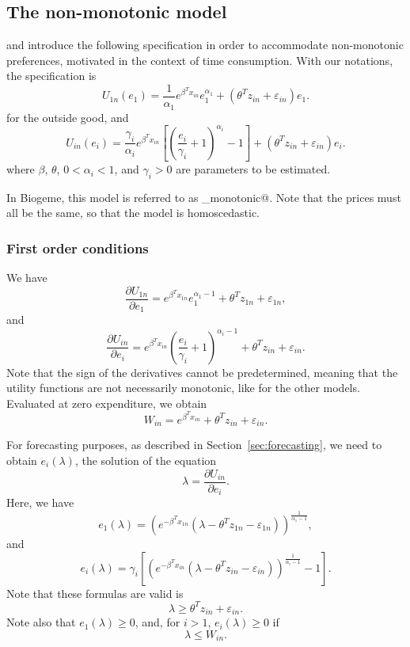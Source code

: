 \documentclass[12pt,a4paper]{article}
\begin{document}
\subsection{The non-monotonic model}

 and  introduce the following specification in order to accommodate non-monotonic preferences, motivated in the context of time consumption. With our notations, the specification is
\[
U_{1n}(e_1) =  \frac{1}{\alpha_1}e^{\beta^T x_{in}}e_1^{\alpha_1}+(\theta^T z_{in} + \varepsilon_{in}) e_1.
\]
for the outside good, and
\[
U_{in}(e_i) = \frac{\gamma_i}{\alpha_i} e^{\beta^T x_{in}}\left[\left(\frac{e_i}{\gamma_i}+1\right)^{\alpha_i}-1\right]+(\theta^T z_{in} + \varepsilon_{in}) e_i.
\]
where $\beta$, $\theta$, $0 < \alpha_i < 1$, and $\gamma_i > 0$  are parameters to be
estimated.

In Biogeme, this model is referred to as \lstinline@non_monotonic@.
Note that the prices must all be the same, so that the model is homoscedastic.

\subsubsection*{First order conditions}

We have
\[
\frac{\partial U_{1n}}{\partial e_1} = e^{\beta^T x_{1n}}  e_1^{\alpha_1-1} + \theta^T z_{1n} + \varepsilon_{1n},
\]
and
\[
\frac{\partial U_{in}}{\partial e_i} = e^{\beta^T x_{in}}  \left(\frac{e_i}{\gamma_i}+1\right)^{\alpha_i-1} + \theta^T z_{in} + \varepsilon_{in}.
\]
Note that the sign of the derivatives cannot be predetermined, meaning that the utility functions are not necessarily
monotonic, like for the other models.
Evaluated at zero expenditure, we obtain
\[
    W_{in} = e^{\beta^T x_{in}} + \theta^T z_{in} + \varepsilon_{in}.
\]

For forecasting purposes, as described in Section~\ref{sec:forecasting}, we need to obtain $e_i(\lambda)$, the solution of the equation
\[\lambda = \frac{\partial U_{in}}{\partial e_i}. \]
Here, we have
\begin{equation}
\label{eq:expenditure_from_lambda_outside}
      e_1(\lambda) =\left(e^{-\beta^T x_{1n}}(\lambda - \theta^T z_{1n} - \varepsilon_{1n})\right)^{\frac{1}{\alpha_1-1}},
\end{equation}
and
\begin{equation}
    \label{eq:expenditure_from_lambda}
  e_i(\lambda) = \gamma_i\left[\left(e^{-\beta^T x_{in}}(\lambda -\theta^T z_{in} - \varepsilon_{in}) \right)^{\frac{1}{\alpha_i-1}}-1\right].
 \end{equation}
Note that these formulas are valid is
\[
    \lambda \geq \theta^T z_{in}+\varepsilon_{in}.
\]
Note also that  $e_1(\lambda) \geq 0$, and,
 for $i>1$, $e_i(\lambda) \geq 0$ if
\[
    \lambda \leq W_{in}.
\]
\end{document}

